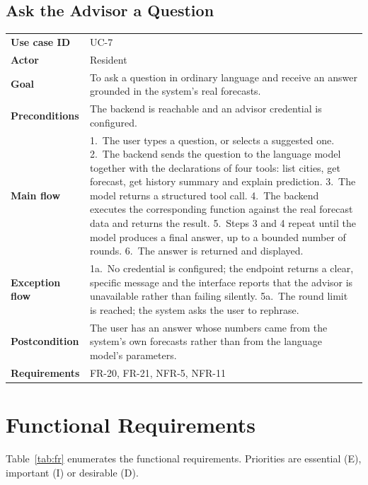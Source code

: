 \subsection{Ask the Advisor a Question}
\begin{xltabular}{\textwidth}{Q{2.9cm} Y}
\toprule
\bfseries Use case ID & UC-7 \\
\bfseries Actor & Resident \\
\bfseries Goal & To ask a question in ordinary language and receive an answer
grounded in the system's real forecasts. \\
\bfseries Preconditions & The backend is reachable and an advisor credential is
configured. \\
\bfseries Main flow & 1.~The user types a question, or selects a suggested one.
2.~The backend sends the question to the language model together with the
declarations of four tools: list cities, get forecast, get history summary and
explain prediction. 3.~The model returns a structured tool call. 4.~The backend
executes the corresponding function against the real forecast data and returns
the result. 5.~Steps 3 and 4 repeat until the model produces a final answer, up
to a bounded number of rounds. 6.~The answer is returned and displayed. \\
\bfseries Exception flow & 1a.~No credential is configured; the endpoint returns
a clear, specific message and the interface reports that the advisor is
unavailable rather than failing silently. 5a.~The round limit is reached; the
system asks the user to rephrase. \\
\bfseries Postcondition & The user has an answer whose numbers came from the
system's own forecasts rather than from the language model's parameters. \\
\bfseries Requirements & FR-20, FR-21, NFR-5, NFR-11 \\
\bottomrule
\end{xltabular}

\section{Functional Requirements}
Table~\ref{tab:fr} enumerates the functional requirements. Priorities are
essential (E), important (I) or desirable (D).

